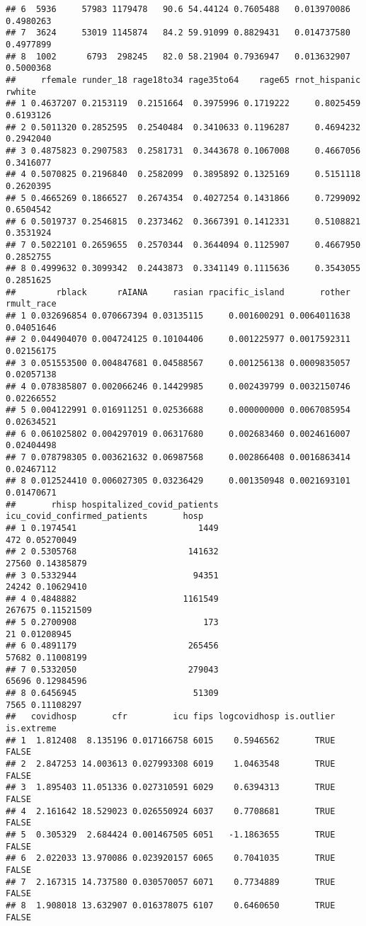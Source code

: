 \documentclass[
]{article}
\begin{document}
\begin{verbatim}
## 6  5936     57983 1179478   90.6 54.44124 0.7605488   0.013970086 0.4980263
## 7  3624     53019 1145874   84.2 59.91099 0.8829431   0.014737580 0.4977899
## 8  1002      6793  298245   82.0 58.21904 0.7936947   0.013632907 0.5000368
##     rfemale runder_18 rage18to34 rage35to64    rage65 rnot_hispanic    rwhite
## 1 0.4637207 0.2153119  0.2151664  0.3975996 0.1719222     0.8025459 0.6193126
## 2 0.5011320 0.2852595  0.2540484  0.3410633 0.1196287     0.4694232 0.2942040
## 3 0.4875823 0.2907583  0.2581731  0.3443678 0.1067008     0.4667056 0.3416077
## 4 0.5070825 0.2196840  0.2582099  0.3895892 0.1325169     0.5151118 0.2620395
## 5 0.4665269 0.1866527  0.2674354  0.4027254 0.1431866     0.7299092 0.6504542
## 6 0.5019737 0.2546815  0.2373462  0.3667391 0.1412331     0.5108821 0.3531924
## 7 0.5022101 0.2659655  0.2570344  0.3644094 0.1125907     0.4667950 0.2852755
## 8 0.4999632 0.3099342  0.2443873  0.3341149 0.1115636     0.3543055 0.2851625
##        rblack      rAIANA     rasian rpacific_island       rother rmult_race
## 1 0.032696854 0.070667394 0.03135115     0.001600291 0.0064011638 0.04051646
## 2 0.044904070 0.004724125 0.10104406     0.001225977 0.0017592311 0.02156175
## 3 0.051553500 0.004847681 0.04588567     0.001256138 0.0009835057 0.02057138
## 4 0.078385807 0.002066246 0.14429985     0.002439799 0.0032150746 0.02266552
## 5 0.004122991 0.016911251 0.02536688     0.000000000 0.0067085954 0.02634521
## 6 0.061025802 0.004297019 0.06317680     0.002683460 0.0024616007 0.02404498
## 7 0.078798305 0.003621632 0.06987568     0.002866408 0.0016863414 0.02467112
## 8 0.012524410 0.006027305 0.03236429     0.001350948 0.0021693101 0.01470671
##       rhisp hospitalized_covid_patients icu_covid_confirmed_patients       hosp
## 1 0.1974541                        1449                          472 0.05270049
## 2 0.5305768                      141632                        27560 0.14385879
## 3 0.5332944                       94351                        24242 0.10629410
## 4 0.4848882                     1161549                       267675 0.11521509
## 5 0.2700908                         173                           21 0.01208945
## 6 0.4891179                      265456                        57682 0.11008199
## 7 0.5332050                      279043                        65696 0.12984596
## 8 0.6456945                       51309                         7565 0.11108297
##   covidhosp       cfr         icu fips logcovidhosp is.outlier is.extreme
## 1  1.812408  8.135196 0.017166758 6015    0.5946562       TRUE      FALSE
## 2  2.847253 14.003613 0.027993308 6019    1.0463548       TRUE      FALSE
## 3  1.895403 11.051336 0.027310591 6029    0.6394313       TRUE      FALSE
## 4  2.161642 18.529023 0.026550924 6037    0.7708681       TRUE      FALSE
## 5  0.305329  2.684424 0.001467505 6051   -1.1863655       TRUE      FALSE
## 6  2.022033 13.970086 0.023920157 6065    0.7041035       TRUE      FALSE
## 7  2.167315 14.737580 0.030570057 6071    0.7734889       TRUE      FALSE
## 8  1.908018 13.632907 0.016378075 6107    0.6460650       TRUE      FALSE
\end{verbatim}
\end{document}
